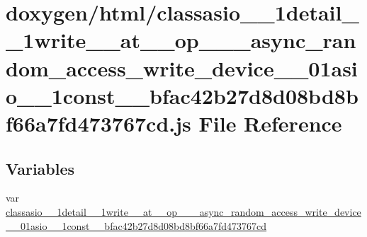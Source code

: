 \hypertarget{classasio__1__1detail__1__1write____at____op__3__01__async__random__access__write__device__00__034bbcf9a4b2d7911235960d319dffc40}{}\section{doxygen/html/classasio\+\_\+\_\+1detail\+\_\+\_\+1write\+\_\+\+\_\+at\+\_\+\+\_\+op\+\_\+\_\+\_\+async\+\_\+random\+\_\+access\+\_\+write\+\_\+device\+\_\+\_\+01asio\+\_\+\_\+1const\+\_\+\+\_\+bfac42b27d8d08bd8bf66a7fd473767cd.js File Reference}
\label{classasio__1__1detail__1__1write____at____op__3__01__async__random__access__write__device__00__034bbcf9a4b2d7911235960d319dffc40}
\subsection*{Variables}
\begin{DoxyCompactItemize}
\item 
var \hyperlink{classasio__1__1detail__1__1write____at____op__3__01__async__random__access__write__device__00__034bbcf9a4b2d7911235960d319dffc40_abf9b94b210404c4c9064471de02bdaed}{classasio\+\_\+\_\+1detail\+\_\+\_\+1write\+\_\+\+\_\+at\+\_\+\+\_\+op\+\_\+\_\+\_\+async\+\_\+random\+\_\+access\+\_\+write\+\_\+device\+\_\+\_\+01asio\+\_\+\_\+1const\+\_\+\+\_\+bfac42b27d8d08bd8bf66a7fd473767cd}
\end{DoxyCompactItemize}


